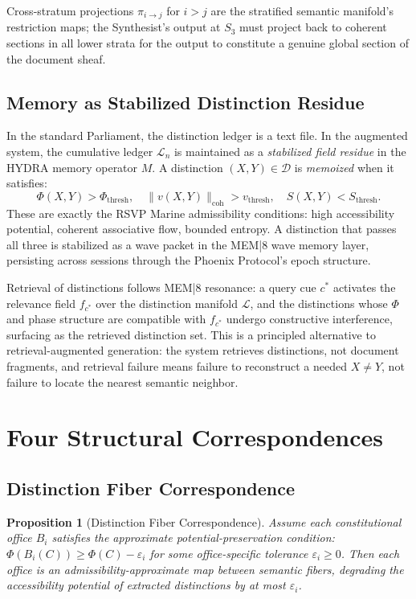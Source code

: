 \documentclass[12pt, a4paper]{article}
\theoremstyle{plain}
\newtheorem{proposition}{Proposition}
\theoremstyle{definition}
\theoremstyle{remark}
\begin{document}
Cross-stratum projections $\pi_{i \to j}$ for $i > j$ are the stratified semantic manifold's restriction maps; the Synthesist's output at $S_3$ must project back to coherent sections in all lower strata for the output to constitute a genuine global section of the document sheaf.

\subsection{Memory as Stabilized Distinction Residue}

In the standard Parliament, the distinction ledger is a text file. In the augmented system, the cumulative ledger $\mathcal{L}_n$ is maintained as a \emph{stabilized field residue} in the HYDRA memory operator $M$. A distinction $(X,Y) \in \mathcal{D}$ is \emph{memoized} when it satisfies:
\[
\Phi(X,Y) > \Phi_\mathrm{thresh}, \quad \|v(X,Y)\|_\mathrm{coh} > v_\mathrm{thresh}, \quad S(X,Y) < S_\mathrm{thresh}.
\]
These are exactly the RSVP Marine admissibility conditions: high accessibility potential, coherent associative flow, bounded entropy. A distinction that passes all three is stabilized as a wave packet in the MEM|8 wave memory layer, persisting across sessions through the Phoenix Protocol's epoch structure.

Retrieval of distinctions follows MEM|8 resonance: a query cue $c^*$ activates the relevance field $f_{c^*}$ over the distinction manifold $\mathcal{L}$, and the distinctions whose $\Phi$ and phase structure are compatible with $f_{c^*}$ undergo constructive interference, surfacing as the retrieved distinction set. This is a principled alternative to retrieval-augmented generation: the system retrieves distinctions, not document fragments, and retrieval failure means failure to reconstruct a needed $X \neq Y$, not failure to locate the nearest semantic neighbor.

\section{Four Structural Correspondences}
\label{sec:theorems}

\subsection{Distinction Fiber Correspondence}

\begin{proposition}[Distinction Fiber Correspondence]
\label{thm:fiber}
Assume each constitutional office $B_i$ satisfies the approximate potential-preservation condition: $\Phi(B_i(C)) \geq \Phi(C) - \varepsilon_i$ for some office-specific tolerance $\varepsilon_i \geq 0$. Then each office is an admissibility-approximate map between semantic fibers, degrading the accessibility potential of extracted distinctions by at most $\varepsilon_i$.
\end{proposition}
\end{document}
